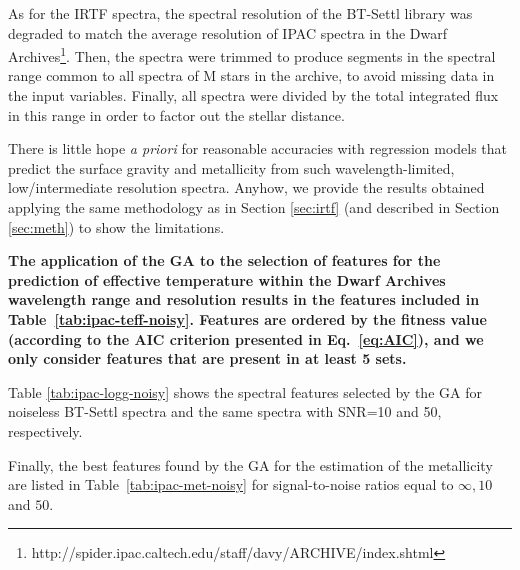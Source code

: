 
As for the IRTF spectra, the spectral resolution of the BT-Settl
library was degraded to match the average resolution of IPAC spectra
in the Dwarf
Archives\footnote{http://spider.ipac.caltech.edu/staff/davy/ARCHIVE/index.shtml}. Then,
the spectra were trimmed to produce segments in the spectral range
common to all spectra of M stars in the archive, to avoid missing data
in the input variables. Finally, all spectra were divided by the total
integrated flux in this range in order to factor out the stellar
distance.

There is little hope {\it a priori} for reasonable accuracies with
regression models that predict the surface gravity and metallicity
from such wavelength-limited, low/intermediate resolution
spectra. Anyhow, we provide the results obtained applying the same
methodology as in Section \ref{sec:irtf} (and described in
Section \ref{sec:meth}) to show the limitations.

{\bf The application of the GA to the selection of features for the
prediction of effective temperature within the Dwarf Archives
wavelength range and resolution results in the features included in
Table~\ref{tab:ipac-teff-noisy}. Features are ordered by the fitness
value (according to the AIC criterion presented in Eq.~\ref{eq:AIC}),
and we only consider features that are present in at least 5 sets.}

Table   %
\ref{tab:ipac-logg-noisy}
shows the spectral features selected by the GA for noiseless BT-Settl
spectra and the same spectra with SNR=10 and 50, respectively.

Finally, the best features found by the GA for the estimation of the
metallicity are listed in 
Table~\ref{tab:ipac-met-noisy} for
signal-to-noise ratios equal to $\infty , 10 $ and $ 50 $.

